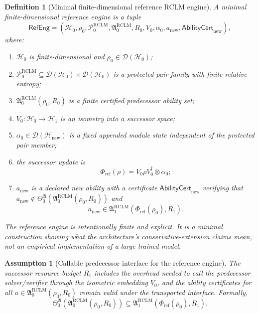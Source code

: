 \documentclass[11pt,a4paper]{article}
\newtheorem{definition}[theorem]{Definition}
\newtheorem{assumption}[theorem]{Assumption}
\newcommand{\D}{\mathcal D}
\newcommand{\Hcal}{\mathcal H}
\newcommand{\Pcal}{\mathcal P}
\newcommand{\RCLM}{\mathrm{RCLM}}
\begin{document}
\begin{definition}[Minimal finite-dimensional reference RCLM engine]
\label{def:minimal-fd-reference-rclm-engine}
A minimal finite-dimensional reference engine is a tuple
\[
\mathsf{RefEng}
=
(\Hcal_0,\rho_0,\Pcal_0^{\RCLM},\mathfrak A_0^{\RCLM},R_0,
V_0,\alpha_0,a_{\mathrm{new}},\mathsf{AbilityCert}_{\mathrm{new}}),
\]
where:
\begin{enumerate}[label=(\roman*),leftmargin=1.5em]
    \item \(\Hcal_0\) is finite-dimensional and \(\rho_0\in\D(\Hcal_0)\);
    \item \(\Pcal_0^{\RCLM}\subseteq\D(\Hcal_0)\times\D(\Hcal_0)\) is a protected pair family with finite relative entropy;
    \item \(\mathfrak A_0^{\RCLM}(\rho_0,R_0)\) is a finite certified predecessor ability set;
    \item \(V_0:\Hcal_0\to\Hcal_1\) is an isometry into a successor space;
    \item \(\alpha_0\in\D(\Hcal_{\mathrm{new}})\) is a fixed appended module state independent of the protected pair member;
    \item the successor update is
    \[
    \Phi_{\mathrm{ref}}(\rho)=V_0\rho V_0^\dagger\otimes\alpha_0;
    \]
    \item \(a_{\mathrm{new}}\) is a declared new ability with a certificate
    \(\mathsf{AbilityCert}_{\mathrm{new}}\) verifying that \(a_{\mathrm{new}}\notin\Theta_0^{\mathfrak A}(\mathfrak A_0^{\RCLM}(\rho_0,R_0))\) and
    \[
    a_{\mathrm{new}}\in
    \mathfrak A_1^{\RCLM}(\Phi_{\mathrm{ref}}(\rho_0),R_1).
    \]
\end{enumerate}
The reference engine is intentionally finite and explicit.  It is a minimal construction showing what the architecture's conservative-extension claims mean, not an empirical implementation of a large trained model.
\end{definition}

\begin{assumption}[Callable predecessor interface for the reference engine]
\label{ass:reference-engine-callable-predecessor}
The successor resource budget \(R_1\) includes the overhead needed to call the predecessor solver/verifier through the isometric embedding \(V_0\), and the ability certificates for all \(a\in\mathfrak A_0^{\RCLM}(\rho_0,R_0)\) remain valid under the transported interface.  Formally,
\[
\Theta_0^{\mathfrak A}
(\mathfrak A_0^{\RCLM}(\rho_0,R_0))
\subseteq
\mathfrak A_1^{\RCLM}(\Phi_{\mathrm{ref}}(\rho_0),R_1).
\]
\end{assumption}
\end{document}
